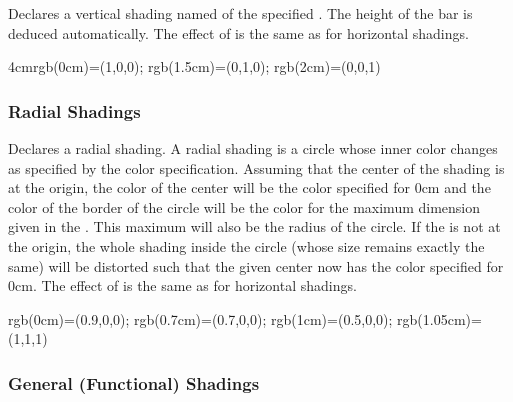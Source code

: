 \begin{command}{\pgfdeclareverticalshading{}}
    Declares a vertical shading named  of the specified
    . The height of the bar is deduced automatically. The effect of
     is the same as for horizontal shadings.
\begin{codeexample}[]
  {4cm}{rgb(0cm)=(1,0,0); rgb(1.5cm)=(0,1,0); rgb(2cm)=(0,0,1)}
\end{codeexample}
\end{command}


\subsubsection{Radial Shadings}

\begin{command}{\pgfdeclareradialshading{}}
    Declares a radial shading. A radial shading is a circle whose inner color
    changes as specified by the color specification. Assuming that the center
    of the shading is at the origin, the color of the center will be the color
    specified for 0cm and the color of the border of the circle will be the
    color for the maximum dimension given in the . This
    maximum will also be the radius of the circle. If the 
    is not at the origin, the whole shading inside the circle (whose size
    remains exactly the same) will be distorted such that the given center now
    has the color specified for 0cm. The effect of  is the
    same as for horizontal shadings.
\begin{codeexample}[]
%
  {rgb(0cm)=(0.9,0,0);
   rgb(0.7cm)=(0.7,0,0);
   rgb(1cm)=(0.5,0,0);
   rgb(1.05cm)=(1,1,1)}
\end{codeexample}
\end{command}


\subsubsection{General (Functional) Shadings}


